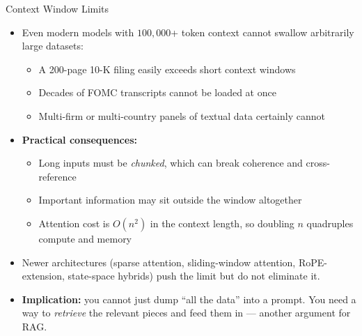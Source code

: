 \documentclass[10pt,english,aspectratio=169]{beamer}
\begin{document}
\begin{frame}{Context Window Limits}
\begin{itemize}
\item Even modern models with $100{,}000$+ token context cannot swallow arbitrarily large datasets:
\begin{itemize}
    \item A 200-page 10-K filing easily exceeds short context windows
    \item Decades of FOMC transcripts cannot be loaded at once
    \item Multi-firm or multi-country panels of textual data certainly cannot
\end{itemize}

\medskip
\item \textbf{Practical consequences:}
\begin{itemize}
    \item Long inputs must be \emph{chunked}, which can break coherence and cross-reference
    \item Important information may sit outside the window altogether
    \item Attention cost is $O(n^2)$ in the context length, so doubling $n$ quadruples compute and memory
\end{itemize}

\medskip
\item Newer architectures (sparse attention, sliding-window attention, RoPE-extension, state-space hybrids) push the limit but do not eliminate it.

\medskip
\item \textbf{Implication:} you cannot just dump ``all the data'' into a prompt. You need a way to \emph{retrieve} the relevant pieces and feed them in --- another argument for RAG.
\end{itemize}
\end{frame}
\end{document}

